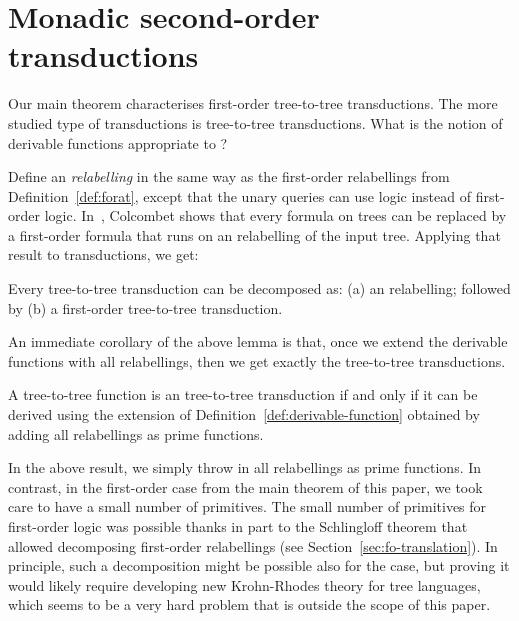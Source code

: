 \section{Monadic second-order transductions}
\label{sec:mso-trans}
Our main theorem characterises first-order tree-to-tree transductions. The more studied type of transductions is \mso tree-to-tree transductions.  What is the notion of derivable functions appropriate to \mso?   

Define an \emph{\mso relabelling} in the same way as the first-order relabellings from Definition~\ref{def:forat}, except that the unary queries can use \mso logic instead of first-order logic. In~\cite[Corollary 1]{colcombetCombinatorialTheoremTrees2007}, Colcombet shows that every \mso formula on trees can be replaced by a first-order formula that runs on an \mso relabelling of the input tree. Applying that result to transductions, we get:
\begin{lemma}
    Every \mso tree-to-tree transduction can be decomposed as: (a) an \mso relabelling; followed by (b) a first-order tree-to-tree transduction.
\end{lemma}
An immediate corollary of the above lemma is that, once we extend the derivable functions with all \mso relabellings, then we get exactly the \mso tree-to-tree transductions. 
\begin{theorem}\label{thm:mso-transductions}
    A tree-to-tree function is an \mso tree-to-tree transduction if and only if it can be derived using the extension of Definition~\ref{def:derivable-function} obtained by adding  all \mso relabellings as prime functions. 
\end{theorem}
In the above result, we simply throw in all \mso relabellings as prime functions. In contrast,  in the first-order case from the main theorem of this paper, we took care to have a small number of primitives. The small number of primitives for first-order logic  was possible thanks in part to the Schlingloff theorem that allowed decomposing first-order relabellings (see Section~\ref{sec:fo-translation}).  In principle, such a decomposition might be possible also for the \mso case, but proving it  would likely require developing new Krohn-Rhodes theory for tree languages, which seems to be a very hard problem that is outside the scope of this paper.



